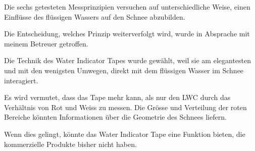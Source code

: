 Die sechs getesteten Messprinzipien versuchen auf unterschiedliche Weise, einen Einflüsse des flüssigen Wassers auf den Schnee abzubilden.

Die Entscheidung, welches Prinzip weiterverfolgt wird, wurde in Absprache mit meinem Betreuer getroffen.

Die Technik des Water Indicator Tapes wurde gewählt, weil sie am elegantesten und mit den wenigsten Umwegen, direkt mit dem flüssigen Wasser im Schnee interagiert.


Es wird vermutet, dass das Tape mehr kann, als nur den LWC durch das Verhältnis von Rot und Weiss zu messen. Die Grösse und Verteilung der roten Bereiche könnten Informationen über die Geometrie des Schnees liefern.

Wenn dies gelingt, könnte das Water Indicator Tape eine Funktion bieten, die kommerzielle Produkte bisher nicht haben.
